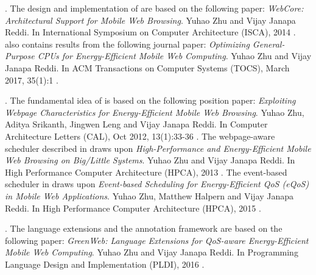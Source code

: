 \textbf{}. The design and implementation of \webcore are based on the following paper: \textit{WebCore: Architectural Support for Mobile Web Browsing}. Yuhao Zhu and Vijay Janapa Reddi. In International Symposium on Computer Architecture (ISCA), 2014 \cite{webcore}.  also contains results from the following journal paper: \textit{Optimizing General-Purpose CPUs for Energy-Efficient Mobile Web Computing}. Yuhao Zhu and Vijay Janapa Reddi. In ACM Transactions on Computer Systems (TOCS), March 2017, 35(1):1 \cite{webcore-tocs}.

\textbf{}. The fundamental idea of \webrt is based on the following position paper:  \textit{Exploiting Webpage Characteristics for Energy-Efficient Mobile Web Browsing}. Yuhao Zhu, Aditya Srikanth, Jingwen Leng and Vijay Janapa Reddi. In Computer Architecture Letters (CAL), Oct 2012, 13(1):33-36 \cite{zhu2014exploiting}. The webpage-aware scheduler described in  draws upon \textit{High-Performance and Energy-Efficient Mobile Web Browsing on Big/Little Systems}. Yuhao Zhu and Vijay Janapa Reddi.  In High Performance Computer Architecture (HPCA), 2013 \cite{big-little}. The event-based scheduler in  draws upon \textit{Event-based Scheduling for Energy-Efficient QoS (eQoS) in Mobile Web Applications}. Yuhao Zhu, Matthew Halpern and Vijay Janapa Reddi. In High Performance Computer Architecture (HPCA), 2015 \cite{ebs}.

\textbf{}. The \greenweb language extensions and the \autogreen annotation framework are based on the following paper: \textit{GreenWeb: Language Extensions for QoS-aware Energy-Efficient Mobile Web Computing}. Yuhao Zhu and Vijay Janapa Reddi. In Programming Language Design and Implementation (PLDI), 2016 \cite{greenweb}.



